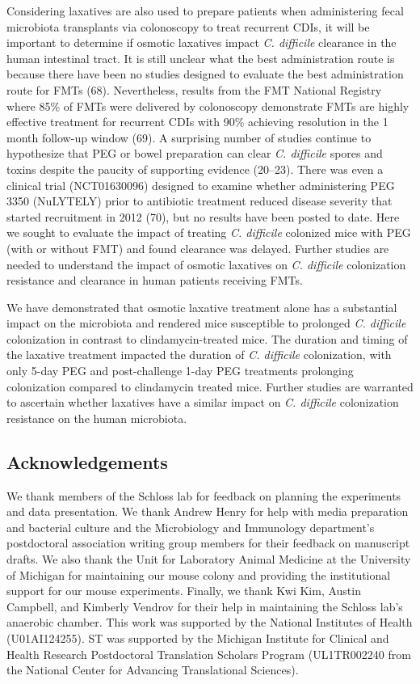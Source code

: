 \documentclass[
  11pt,
]{article}
\begin{document}
Considering laxatives are also used to prepare patients when
administering fecal microbiota transplants via colonoscopy to treat
recurrent CDIs, it will be important to determine if osmotic laxatives
impact \emph{C. difficile} clearance in the human intestinal tract. It
is still unclear what the best administration route is because there
have been no studies designed to evaluate the best administration route
for FMTs (68). Nevertheless, results from the FMT National Registry
where 85\% of FMTs were delivered by colonoscopy demonstrate FMTs are
highly effective treatment for recurrent CDIs with 90\% achieving
resolution in the 1 month follow-up window (69). A surprising number of
studies continue to hypothesize that PEG or bowel preparation can clear
\emph{C. difficile} spores and toxins despite the paucity of supporting
evidence (20--23). There was even a clinical trial (NCT01630096)
designed to examine whether administering PEG 3350 (NuLYTELY) prior to
antibiotic treatment reduced disease severity that started recruitment
in 2012 (70), but no results have been posted to date. Here we sought to
evaluate the impact of treating \emph{C. difficile} colonized mice with
PEG (with or without FMT) and found clearance was delayed. Further
studies are needed to understand the impact of osmotic laxatives on
\emph{C. difficile} colonization resistance and clearance in human
patients receiving FMTs.

We have demonstrated that osmotic laxative treatment alone has a
substantial impact on the microbiota and rendered mice susceptible to
prolonged \emph{C. difficile} colonization in contrast to
clindamycin-treated mice. The duration and timing of the laxative
treatment impacted the duration of \emph{C. difficile} colonization,
with only 5-day PEG and post-challenge 1-day PEG treatments prolonging
colonization compared to clindamycin treated mice. Further studies are
warranted to ascertain whether laxatives have a similar impact on
\emph{C. difficile} colonization resistance on the human microbiota.

\hypertarget{acknowledgements}{%
\subsection{Acknowledgements}\label{acknowledgements}}

We thank members of the Schloss lab for feedback on planning the
experiments and data presentation. We thank Andrew Henry for help with
media preparation and bacterial culture and the Microbiology and
Immunology department's postdoctoral association writing group members
for their feedback on manuscript drafts. We also thank the Unit for
Laboratory Animal Medicine at the University of Michigan for maintaining
our mouse colony and providing the institutional support for our mouse
experiments. Finally, we thank Kwi Kim, Austin Campbell, and Kimberly
Vendrov for their help in maintaining the Schloss lab's anaerobic
chamber. This work was supported by the National Institutes of Health
(U01AI124255). ST was supported by the Michigan Institute for Clinical
and Health Research Postdoctoral Translation Scholars Program
(UL1TR002240 from the National Center for Advancing Translational
Sciences).
\end{document}
